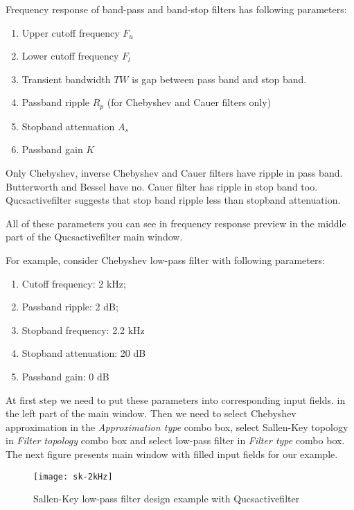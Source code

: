 Frequency response of band-pass and band-stop filters has following
parameters:

\begin{enumerate}
 \item Upper cutoff frequency $F_u$
 \item Lower cutoff frequency $F_l$
 \item Transient bandwidth $TW$ is gap between pass band and stop band.
 \item Passband ripple $R_p$ (for Chebyshev and Cauer filters only)
 \item Stopband attenuation $A_s$
 \item Passband gain $K$
\end{enumerate}

Only Chebyshev, inverse Chebyshev and Cauer filters have ripple in pass band.
Butterworth and Bessel have no. Cauer filter has ripple in stop band too.
Qucsactivefilter suggests that stop band ripple less than stopband attenuation.

All of these parameters you can see in frequency response preview in the middle
part of the Qucsactivefilter main window.


For example, consider Chebyshev low-pass filter with following parameters:

\begin{enumerate}
 \item Cutoff frequency: 2 kHz;
 \item Passband ripple: 2 dB;
 \item Stopband frequency: 2.2 kHz
 \item Stopband attenuation: 20 dB
 \item Passband gain: 0 dB
\end{enumerate}

At first step we need to put these parameters into corresponding input fields.
in the left part of the main window. Then we need to select Chebyshev
approximation in the \emph{Approximation type} combo box, select Sallen-Key
topology in \emph{Filter topology} combo box and select low-pass filter in
\emph{Filter type} combo box. The next figure presents main window with filled
input fields for our example.

\begin{figure}[ht]
  \centering
  \texttt{[image: sk-2kHz]}
  \caption{Sallen-Key low-pass filter design example with Qucsactivefilter}
  \label{fig:sk2kHz}
\end{figure}
\FloatBarrier


